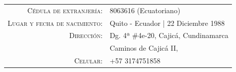 \documentclass[a4paper]{article}
\begin{document}

\begin{tabular}{rl}
  \textsc{Cédula de extranjería:} & 8063616 (Ecuatoriano)\\
  \textsc{Lugar y fecha de nacimiento:} & Quito - Ecuador  | 22 Diciembre 1988 \\
  \textsc{Dirección:} & Dg. 4ª \#4e-20, Cajicá, Cundinamarca \\
                      & Caminos de Cajicá II, \\
  \textsc{Celular:} & +57 3174751858\\
\end{tabular}

\end{document}
